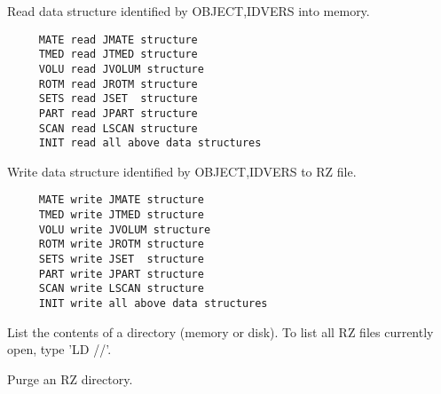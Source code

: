 \BEGARG
{}
\ENDARG

   \par
Read data structure identified by OBJECT,IDVERS into memory.  
\begin{verbatim}
     MATE read JMATE structure
     TMED read JTMED structure
     VOLU read JVOLUM structure
     ROTM read JROTM structure
     SETS read JSET  structure
     PART read JPART structure
     SCAN read LSCAN structure
     INIT read all above data structures
\end{verbatim}

\ENDCMD


\BEGARG
{}
\ENDARG

   \par
Write data structure identified by OBJECT,IDVERS to RZ file.  
\begin{verbatim}
     MATE write JMATE structure
     TMED write JTMED structure
     VOLU write JVOLUM structure
     ROTM write JROTM structure
     SETS write JSET  structure
     PART write JPART structure
     SCAN write LSCAN structure
     INIT write all above data structures
\end{verbatim}

\ENDCMD


\BEGARG
{}
\ENDARG

   \par
List the contents of a directory (memory or disk).  To list all RZ files 
   currently open, type 'LD //'.  

\ENDCMD


\BEGARG
{}
\ENDARG

   \par
Purge an RZ directory.  

\ENDCMD


\BEGARG
{}
\ENDARG

